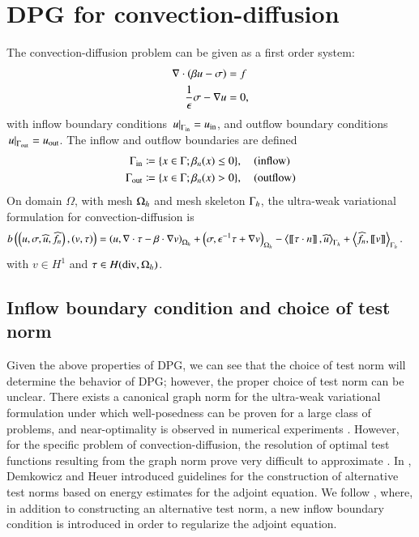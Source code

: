 \section{DPG for convection-diffusion}

The convection-diffusion problem can be given as a first order system: 
\begin{align*}
\div \left(\beta u - \sigma\right) &= f\\
\frac{1}{\epsilon}\sigma - \grad u &= 0,
\end{align*}
with inflow boundary conditions $\left.u\right|_{\Gamma_{\rm in}} = u_{\rm in}$, and outflow boundary conditions $\left.u\right|_{\Gamma_{\rm out}} = u_{\rm out}$.  The inflow and outflow boundaries are defined
\begin{align*}
\Gamma_{\rm in} &\coloneqq \{x\in \Gamma; \beta_n(x) \leq 0\}, \quad {\rm (inflow)}\\ 
\Gamma_{\rm out} &\coloneqq \{x\in \Gamma; \beta_n(x) > 0\}, \quad {\rm (outflow)}
\end{align*}
On domain $\Omega$, with mesh $\Oh$ and mesh skeleton $\Gh$, the ultra-weak variational formulation for convection-diffusion is
\begin{align*}
b\left(\left(u,\sigma, \widehat{u}, \widehat{f}_n\right),\left( v, \tau \right)\right) &= 
\left(u,\div \tau - \beta \cdot \grad v\right)_{\Oh} + \left(\sigma, \epsilon^{-1} \tau + \grad v\right)_{\Oh} 
- \LRa{\jump{\tau\cdot n}, \widehat{u} }_{\Gh} + \LRa{ \widehat{f}_n, \jump{v} }_{\Gh}.
\end{align*}
with $v\in H^1$ and $\tau \in H({\rm div},\Oh)$. 

\subsection{Inflow boundary condition and choice of test norm}

Given the above properties of DPG, we can see that the choice of test norm will determine the behavior of DPG; however, the proper choice of test norm can be unclear.  There exists a canonical graph norm for the ultra-weak variational formulation under which well-posedness can be proven for a large class of problems, and near-optimality is observed in numerical experiments \cite{DPG4, Bui-ThanhDemkowiczGhattas11b, stokesDPG}.  However, for the specific problem of convection-diffusion, the resolution of optimal test functions resulting from the graph norm prove very difficult to approximate \cite{globalLocalDPG}.  In \cite{DPGrobustness}, Demkowicz and Heuer introduced guidelines for the construction of alternative test norms based on energy estimates for the adjoint equation. We follow \cite{DPGrobustness2}, where, in addition to constructing an alternative test norm, a new inflow boundary condition is introduced in order to regularize the adjoint equation.  


